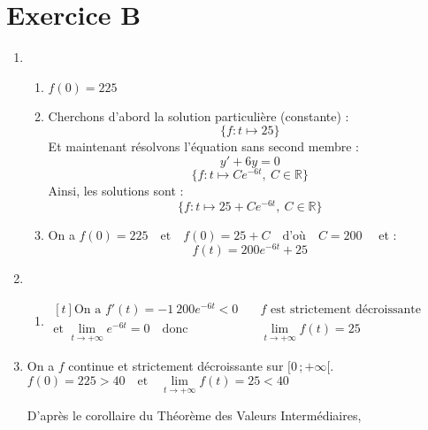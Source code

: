 \documentclass{scrartcl}
\begin{document}
    \section*{Exercice B}
    \begin{adjustwidth}{2em}{0pt}
        \begin{enumerate}
            \item	\begin{enumerate}[label=\alph*)]
                        \item	$f(0)=225$
                        \item   Cherchons d'abord la solution particulière (constante) :
                                \[\big\{f:t\mapsto 25\big\}\]
                                Et maintenant résolvons l'équation sans second membre :
                                \[y'+6y=0\]
                                \[\big\{f:t\mapsto Ce^{-6t},\ C\in\mathbb{R}\big\}\]
                                Ainsi, les solutions sont :
                                \[\boxed{\big\{f:t\mapsto 25+Ce^{-6t},\ C\in\mathbb{R}\big\}}\]
                        \item   On a $f(0)=225\quad\text{et}\quad f(0)=25+C\quad\text{d'où}\quad C=200\quad$ et : \[\boxed{f(t)=200e^{-6t}+25}\]
                    \end{enumerate}
                    \pagebreak
            \item   \begin{enumerate}[label=\alph*)]
                        \item	$\begin{aligned}[t]
                                    \text{On a }f'(t)=-1\ 200e^{-6t}<0\quad&\boxed{f\text{ est strictement décroissante}} \\
                                    \text{et }\lim\limits_{t\to +\infty}e^{-6t}=0\quad\text{donc}\quad&\boxed{\lim\limits_{t\to +\infty}f(t)=25}
                                \end{aligned}$
                                \vspace{1em}
                                \begin{center}
                                \end{center}
                    \end{enumerate}
            \item   On a $f$ continue et strictement décroissante sur $\big[0\,;+\infty\big[$. \\ $f(0)=225>40\quad\text{et}\quad\lim\limits_{t\to +\infty}f(t)=25<40$ \par D'après le corollaire du Théorème des Valeurs Intermédiaires, \\ \fbox{l'équation $f(t)=40$ admet une unique solution dans $\big[0\,;+\infty\big[$}

\end{enumerate}
\end{adjustwidth}
\end{document}
